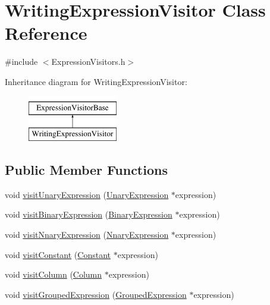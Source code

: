 \hypertarget{class_writing_expression_visitor}{\section{Writing\+Expression\+Visitor Class Reference}
\label{class_writing_expression_visitor}
}


{\ttfamily \#include $<$Expression\+Visitors.\+h$>$}

Inheritance diagram for Writing\+Expression\+Visitor\+:\begin{figure}[H]
\begin{center}
\leavevmode
\includegraphics[height=2.000000cm]{class_writing_expression_visitor}
\end{center}
\end{figure}
\subsection*{Public Member Functions}
\begin{DoxyCompactItemize}
\item 
void \hyperlink{class_writing_expression_visitor_ae9e2e5b8ba44dbde0d8e9461df5add9b}{visit\+Unary\+Expression} (\hyperlink{class_unary_expression}{Unary\+Expression} $\ast$expression)
\item 
void \hyperlink{class_writing_expression_visitor_ad6302b69c3d050b280d10449eb90ee47}{visit\+Binary\+Expression} (\hyperlink{class_binary_expression}{Binary\+Expression} $\ast$expression)
\item 
void \hyperlink{class_writing_expression_visitor_a36c7ec04fda1f4b5435259331669d11a}{visit\+Nnary\+Expression} (\hyperlink{class_nnary_expression}{Nnary\+Expression} $\ast$expression)
\item 
void \hyperlink{class_writing_expression_visitor_aff9e80097dbb4d0f08e2052cd7146371}{visit\+Constant} (\hyperlink{class_constant}{Constant} $\ast$expression)
\item 
void \hyperlink{class_writing_expression_visitor_ac2a8314129b6b238a184b3d6f6fa40c0}{visit\+Column} (\hyperlink{class_column}{Column} $\ast$expression)
\item 
void \hyperlink{class_writing_expression_visitor_adcd079cbe5995822236c5b9fdb4b0532}{visit\+Grouped\+Expression} (\hyperlink{class_grouped_expression}{Grouped\+Expression} $\ast$expression)
\end{DoxyCompactItemize}
